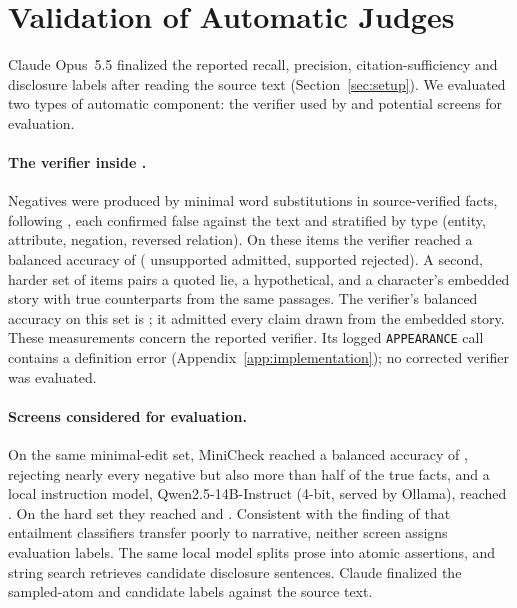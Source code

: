 \section{Validation of Automatic Judges}
\label{app:evaluator}

Claude Opus~5.5 finalized the reported recall, precision, citation-sufficiency and disclosure
labels after reading the source text (Section~\ref{sec:setup}). We evaluated two types of
automatic component: the verifier used by \sys and potential screens for evaluation.

\paragraph{The verifier inside \sys.} Negatives were produced by minimal word substitutions in
source-verified facts, following \citet{jeong2025narrativefactscore}, each confirmed false
against the text and stratified by type (entity, attribute, negation, reversed relation). On
these  items the verifier reached a balanced accuracy of 
( unsupported admitted,  supported rejected). A
second, harder set of  items pairs a quoted lie, a hypothetical, and a
character's embedded story with true counterparts from the same passages. The verifier's
balanced accuracy on this set is ; it admitted every claim
drawn from the embedded story.
These measurements concern the reported verifier. Its logged \texttt{APPEARANCE} call
contains a definition error (Appendix~\ref{app:implementation}); no corrected verifier
was evaluated.

\paragraph{Screens considered for evaluation.} On the same minimal-edit set, MiniCheck
\citep{tang2024minicheck} reached a balanced accuracy of , rejecting nearly
every negative but also more than half of the true facts, and a local instruction model,
Qwen2.5-14B-Instruct \citep{qwen2024qwen25} (4-bit, served by Ollama), reached
. On the hard set they reached  and
. Consistent with the finding of \citet{subbiah2024storysumm} that
entailment classifiers transfer poorly to narrative, neither screen assigns evaluation
labels. The same local model splits prose into atomic assertions, and string search retrieves
candidate disclosure sentences. Claude finalized the sampled-atom and candidate labels
against the source text.
